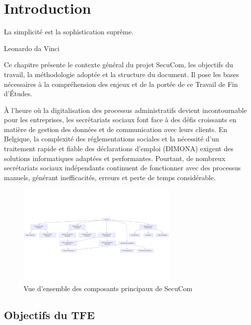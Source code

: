 \chapter{Introduction}

\epigraph{La simplicité est la sophistication suprême.}{Leonardo da Vinci}

\begin{mdframed}[backgroundcolor=lightgray!30, linewidth=0pt, innertopmargin=10pt, innerbottommargin=10pt, leftmargin=10pt, rightmargin=10pt]
\small
Ce chapitre présente le contexte général du projet SecuCom, les objectifs du travail, la méthodologie adoptée et la structure du document. Il pose les bases nécessaires à la compréhension des enjeux et de la portée de ce Travail de Fin d'Études.
\end{mdframed}

\vspace{0.5cm}

À l'heure où la digitalisation des processus administratifs devient incontournable pour les entreprises, les secrétariats sociaux font face à des défis croissants en matière de gestion des données et de communication avec leurs clients. En Belgique, la complexité des réglementations sociales et la nécessité d'un traitement rapide et fiable des déclarations d'emploi (DIMONA) exigent des solutions informatiques adaptées et performantes. Pourtant, de nombreux secrétariats sociaux indépendants continuent de fonctionner avec des processus manuels, générant inefficacités, erreurs et perte de temps considérable.

\begin{figure}[h]
\centering
\includegraphics[width=0.7\textwidth]{ComposantsDiagram.png}
\caption{Vue d'ensemble des composants principaux de SecuCom}
\label{fig:composants-overview}
\end{figure}

\section{Objectifs du TFE}


